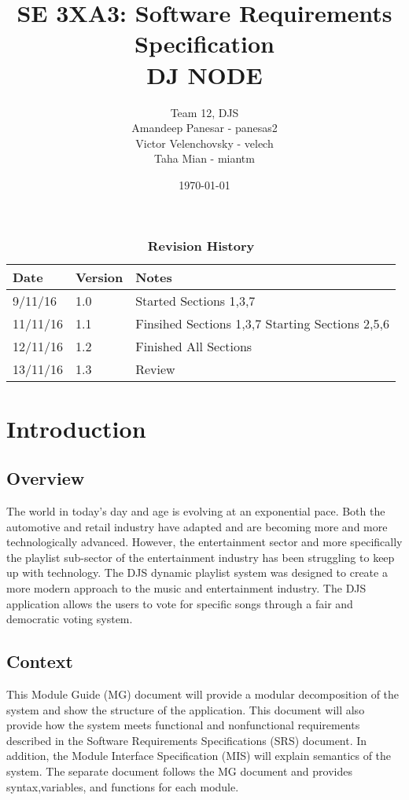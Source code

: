 \documentclass[12pt, titlepage]{article}
\title{SE 3XA3: Software Requirements Specification\\DJ NODE}
\author{Team 12, DJS
		\\ Amandeep Panesar - panesas2
		\\ Victor Velenchovsky - velech
		\\ Taha Mian - miantm
}
\date{\today}
\begin{document}
\maketitle


\tableofcontents
\listoftables
\listoffigures


\begin{table}[h]
\caption{\bf Revision History}
\begin{tabularx}{\textwidth}{p{3cm}p{2cm}X}
\toprule {\bf Date} & {\bf Version} & {\bf Notes}\\
\midrule
9/11/16 & 1.0 & Started Sections 1,3,7\\
11/11/16 & 1.1 & Finsihed Sections 1,3,7 Starting Sections 2,5,6\\
12/11/16 & 1.2 & Finished All Sections\\ 
13/11/16 & 1.3 & Review \\

\bottomrule

\end{tabularx}
\end{table}


\clearpage




\section{Introduction}
\subsection{Overview}
The world in today's day and age is evolving at an exponential pace. Both the automotive and retail industry have adapted and are becoming more and more technologically advanced. However, the entertainment sector and more specifically the playlist sub-sector of the entertainment industry has been struggling to keep up with technology. The DJS dynamic playlist system was designed to create a more modern approach to the music and entertainment industry. The DJS application allows the users to vote for specific songs through a fair and democratic voting system.
\subsection{Context}
This Module Guide (MG) document will provide a modular decomposition of the system and show the structure of the application. This document will also provide how the system meets functional and nonfunctional requirements described in the Software Requirements Specifications (SRS) document. In addition, the Module Interface Specification (MIS) will explain semantics of the system. The separate document follows the MG document and provides syntax,variables, and functions for each module.
\end{document}
